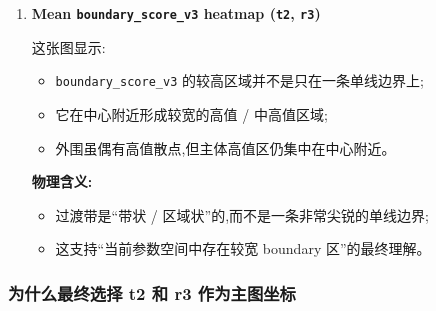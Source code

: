\documentclass[lang=cn,scheme=chinese,color=blue,device=normal,toc=onecol,math=cm]{elegantbook}
\begin{document}
\begin{enumerate}
\textbf{物理含义:}\par
 
\begin{itemize}
\item A /\allowbreak{} B /\allowbreak{} C 三层融合后的“综合拓扑可信度”在 \texttt{t2-r3} 平面上存在显著热点;
\item \texttt{t2} 和 \texttt{r3} 的联动对最终相结构确实重要。
\end{itemize}
\item \textbf{Mean \texttt{boundary\_\allowbreak{}score\_\allowbreak{}v3} heatmap (\texttt{t2}, \texttt{r3})}\par
 
这张图显示:\par
 
\begin{itemize}
\item \texttt{boundary\_\allowbreak{}score\_\allowbreak{}v3} 的较高区域并不是只在一条单线边界上;
\item 它在中心附近形成较宽的高值 /\allowbreak{} 中高值区域;
\item 外围虽偶有高值散点,但主体高值区仍集中在中心附近。
\end{itemize}
 
\textbf{物理含义:}\par
 
\begin{itemize}
\item 过渡带是“带状 /\allowbreak{} 区域状”的,而不是一条非常尖锐的单线边界;
\item 这支持“当前参数空间中存在较宽 boundary 区”的最终理解。
\end{itemize}
\end{enumerate}


\subsubsection{为什么最终选择 t2 和 r3 作为主图坐标}
\end{document}
